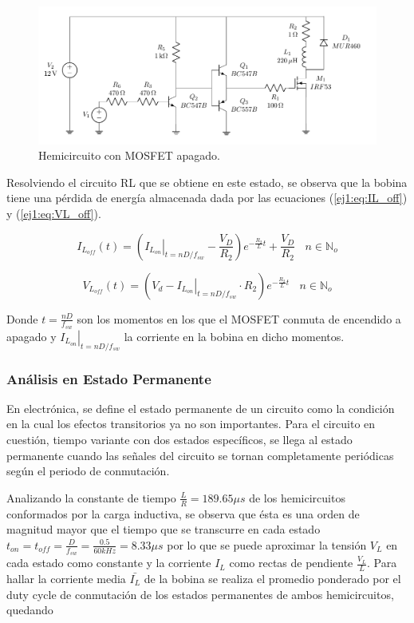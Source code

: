 \begin{figure}[H]
	\centering
	\includegraphics[width=0.7\linewidth, page=2]{ImagenesEjercicio-1/CircuitsEj1}
	\caption{Hemicircuito con MOSFET apagado.}
	\label{ej1:fig:circuito_off}
\end{figure}

Resolviendo el circuito RL que se obtiene en este estado, se observa que la bobina tiene una pérdida de energía almacenada dada por las ecuaciones (\ref{ej1:eq:IL_off}) y (\ref{ej1:eq:VL_off}).

\begin{equation}
	 I_{L_{off}}(t) = \left( \left. I_{L_{on}} \right|_{t= nD/f_{sw}} -\frac{V_D}{R_2}\right) e^{-\frac{R_2}{L}t} + \frac{V_D}{R_2} \ \ \ \ n \in \mathbb{N}_o
\label{ej1:eq:IL_off}
\end{equation}

\begin{equation}
	 V_{L_{off}}(t) = \left( V_d - \left. I_{L_{on}} \right|_{t= nD/f_{sw}} \cdot R_2 \right)e^{-\frac{R_2}{L}t} \ \ \ \ n \in \mathbb{N}_o
\label{ej1:eq:VL_off}
\end{equation}

Donde $t=\frac{nD}{f_{sw}}$ son los momentos en los que el MOSFET conmuta de encendido a apagado y $\left. I_{L_{on}} \right|_{t= nD/f_{sw}}$ la corriente en la bobina en dicho momentos. 

\subsubsection{Análisis en Estado Permanente}

En electrónica, se define el estado permanente de un circuito como la condición en la cual los efectos transitorios ya no son importantes. Para el circuito en cuestión, tiempo variante con dos estados específicos, se llega al estado permanente cuando las señales del circuito se tornan completamente periódicas según el periodo de conmutación. 

Analizando la constante de tiempo $\frac{L}{R} = 189.65\mu s$ de los hemicircuitos conformados por la carga inductiva, se observa que ésta es una orden de magnitud mayor que el tiempo que se transcurre en cada estado $t_{on} = t_{off} = \frac{D}{f_{sw}} = \frac{0.5}{60kHz} = 8.33\mu s$ por lo que se puede aproximar la tensión $V_L$ en cada estado como constante y la corriente $I_L$ como rectas de pendiente $\frac{V_L}{L}$. Para hallar la corriente media $\bar{I_L}$ de la bobina se realiza el promedio ponderado por el duty cycle de conmutación de los estados permanentes de ambos hemicircuitos, quedando

